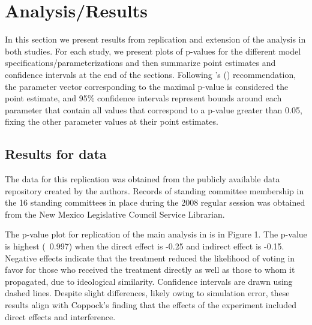 \documentclass[12pt]{article}
\def\citeapos#1{\citeauthor{#1}'s (\citeyear{#1})}
\begin{document}
\section{Analysis/Results}

In this section we present results from replication and extension of the analysis in both studies. For each study, we present plots of p-values for the different model specifications/parameterizations and then summarize point estimates and confidence intervals at the end of the sections. Following \citeapos{bowers2012reasoning} recommendation, the parameter vector corresponding to the maximal p-value is considered the point estimate, and 95\% confidence intervals represent bounds around each parameter that contain all values that correspond to a p-value greater than 0.05, fixing the other parameter values at their point estimates.


\subsection{Results for \citet{butler2011can} data}

The data for this replication was obtained from the publicly available data repository created by the authors. Records of standing committee membership in the 16 standing committees in place during the 2008 regular session was obtained from the New Mexico Legislative Council Service Librarian.

The p-value plot for replication of the main analysis in \citet{coppock2014information} is in Figure 1. The p-value is highest (~0.997) when the direct effect is -0.25 and indirect effect is -0.15. Negative effects indicate that the treatment reduced the likelihood of voting in favor for those who received the treatment directly as well as those to whom it propagated, due to ideological similarity. Confidence intervals are drawn using dashed lines. Despite slight differences, likely owing to simulation error, these results align with Coppock's finding that the effects of the experiment included direct effects and interference.
\end{document}
